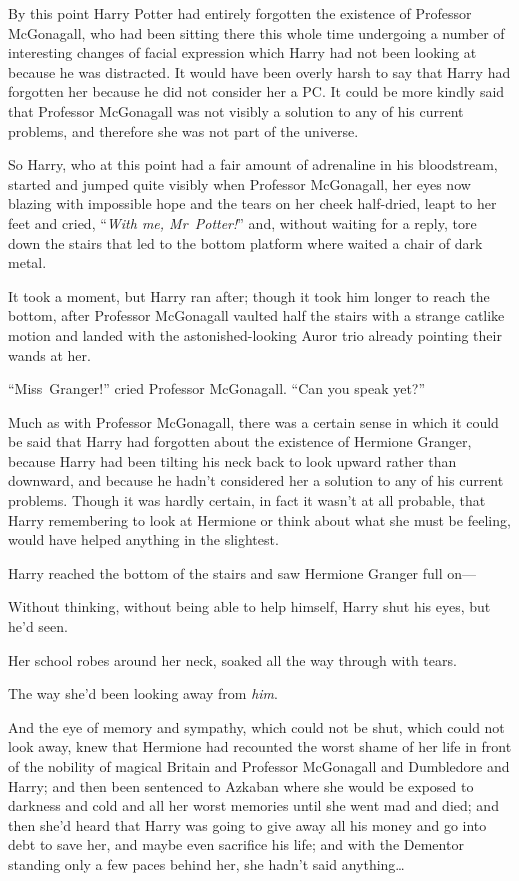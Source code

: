 By this point Harry Potter had entirely forgotten the existence of Professor McGonagall, who had been sitting there this whole time undergoing a number of interesting changes of facial expression which Harry had not been looking at because he was distracted. It would have been overly harsh to say that Harry had forgotten her because he did not consider her a PC. It could be more kindly said that Professor McGonagall was not visibly a solution to any of his current problems, and therefore she was not part of the universe.

So Harry, who at this point had a fair amount of adrenaline in his bloodstream, started and jumped quite visibly when Professor McGonagall, her eyes now blazing with impossible hope and the tears on her cheek half-dried, leapt to her feet and cried, “\emph{With me, Mr~Potter!}” and, without waiting for a reply, tore down the stairs that led to the bottom platform where waited a chair of dark metal.

It took a moment, but Harry ran after; though it took him longer to reach the bottom, after Professor McGonagall vaulted half the stairs with a strange catlike motion and landed with the astonished-looking Auror trio already pointing their wands at her.

“Miss~Granger!” cried Professor McGonagall. “Can you speak yet?”

Much as with Professor McGonagall, there was a certain sense in which it could be said that Harry had forgotten about the existence of Hermione Granger, because Harry had been tilting his neck back to look upward rather than downward, and because he hadn’t considered her a solution to any of his current problems. Though it was hardly certain, in fact it wasn’t at all probable, that Harry remembering to look at Hermione or think about what she must be feeling, would have helped anything in the slightest.

Harry reached the bottom of the stairs and saw Hermione Granger full on—

Without thinking, without being able to help himself, Harry shut his eyes, but he’d seen.

Her school robes around her neck, soaked all the way through with tears.

The way she’d been looking away from \emph{him}.

And the eye of memory and sympathy, which could not be shut, which could not look away, knew that Hermione had recounted the worst shame of her life in front of the nobility of magical Britain and Professor McGonagall and Dumbledore and Harry; and then been sentenced to Azkaban where she would be exposed to darkness and cold and all her worst memories until she went mad and died; and then she’d heard that Harry was going to give away all his money and go into debt to save her, and maybe even sacrifice his life; and with the Dementor standing only a few paces behind her, she hadn’t said anything…

